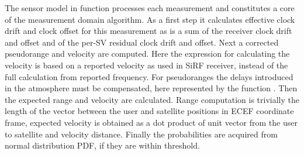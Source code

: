 The sensor model in function \observationProbabilityGPS{} processes each measurement
and constitutes a core of the measurement domain algorithm.
As a first step it calculates effective clock drift and clock offset for this
measurement as is a sum of the receiver clock drift and offset and of the 
per-SV residual clock drift and offset.
Next a corrected pseudorange and velocity are computed.
Here the expression for calculating the velocity is based on a reported velocity
as used in SiRF receiver, instead of the full calculation from reported frequency.
For pseudoranges the delays introduced in the atmosphere must be compensated,
here represented by the function \delays{}.
Then the expected range and velocity are calculated.
Range computation is trivially the length of the vector between the user and 
satellite positions in ECEF coordinate frame, expected velocity is obtained
as a dot product of unit vector from the user to satellite and velocity distance.
Finally the probabilities are acquired from normal distribution PDF, if they
are within threshold.

